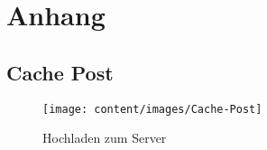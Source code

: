 \chapter{Anhang}
\label{cha:anhang}



\section{Cache Post}

\begin{figure}[h]
\centering
\texttt{[image: content/images/Cache-Post]}
\caption{Hochladen zum Server}
\label{pic:cachePost}
\end{figure}